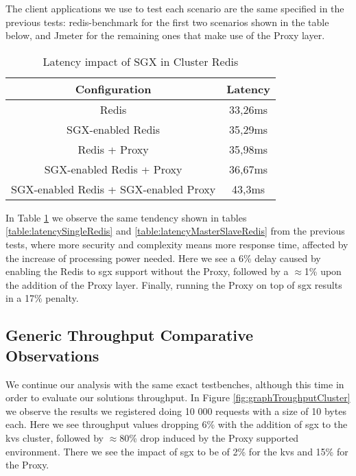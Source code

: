 The client applications we use to test each scenario are the same specified in the previous tests: redis-benchmark for the first two scenarios shown in the table below, and Jmeter for the remaining ones that make use of the Proxy layer.

\begin{table}[ht]
	\caption{Latency impact of SGX in Cluster Redis} %
	\centering %
	\begin{tabular}{c c} %
		\hline\hline %
		\textbf{Configuration} & \textbf{Latency} \\ [0.5ex] %
		\hline
		Redis & 33,26ms\\
		\hline
		SGX-enabled Redis & 35,29ms \\
		\hline
		Redis + Proxy & 35,98ms \\
		\hline
		SGX-enabled Redis + Proxy & 36,67ms \\
		\hline %
		SGX-enabled Redis + SGX-enabled Proxy & 43,3ms\\ [1ex] %
		\hline %
	\end{tabular}
	\label{table:latencyClusterRedis} %
\end{table}

In Table \ref{table:latencyClusterRedis} we observe the same tendency shown in tables \ref{table:latencySingleRedis} and \ref{table:latencyMasterSlaveRedis} from the previous tests, where more security and complexity means more response time, affected by the increase of processing power needed.
Here we see a 6\% delay caused by enabling the Redis to \gls{sgx} support without the Proxy, followed by a $\approx$1\% upon the addition of the Proxy layer. Finally, running the Proxy on top of \gls{sgx} results in a 17\% penalty.

\subsection{Generic Throughput Comparative Observations}

We continue our analysis with the same exact testbenches, although this time in order to evaluate our solutions throughput. In Figure \ref{fig:graphTroughputCluster} we observe the results we registered doing 10 000 requests with a size of 10 bytes each. 
Here we see throughput values dropping 6\% with the addition of \gls{sgx} to the \gls{kvs} cluster, followed by $\approx$80\% drop induced by the Proxy supported environment. There we see the impact of \gls{sgx} to be of 2\% for the \gls{kvs} and 15\% for the Proxy.

